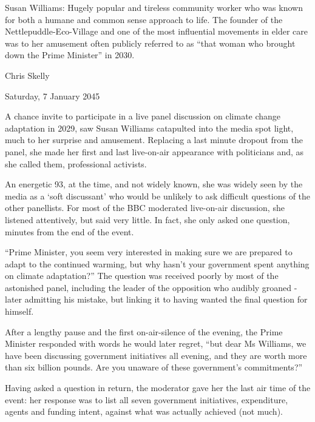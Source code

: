 Susan Williams: Hugely popular and tireless community worker who was known for both a humane and common sense approach to life. The founder of the Nettlepuddle-Eco-Village and one of the most influential movements in elder care was to her amusement often publicly referred to as ``that woman who brought down the Prime Minister'' in 2030.

Chris Skelly

Saturday, 7 January 2045

A chance invite to participate in a live panel discussion on climate change adaptation in 2029, saw Susan Williams catapulted into the media spot light, much to her surprise and amusement. Replacing a last minute dropout from the panel, she made her first and last live-on-air appearance with politicians and, as she called them, professional activists.

An energetic 93, at the time, and not widely known, she was widely seen by the media as a `soft discussant' who would be unlikely to ask difficult questions of the other panellists. For most of the BBC moderated live-on-air discussion, she listened attentively, but said very little. In fact, she only asked one question, minutes from the end of the event.

``Prime Minister, you seem very interested in making sure we are prepared to adapt to the continued warming, but why hasn't your government spent anything on climate adaptation?'' The question was received poorly by most of the astonished panel, including the leader of the opposition who audibly groaned - later admitting his mistake, but linking it to having wanted the final question for himself.

After a lengthy pause and the first on-air-silence of the evening, the Prime Minister responded with words he would later regret, ``but dear Ms Williams, we have been discussing government initiatives all evening, and they are worth more than six billion pounds. Are you unaware of these government's commitments?''

Having asked a question in return, the moderator gave her the last air time of the event: her response was to list all seven government initiatives, expenditure, agents and funding intent, against what was actually achieved (not much). 

